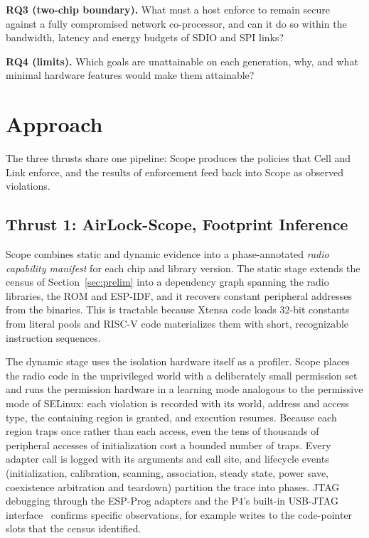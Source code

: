 \documentclass[conference,10pt]{IEEEtran}
\begin{document}
\textbf{RQ3 (two-chip boundary).} What must a host enforce to remain secure against a fully compromised network co-processor, and can it do so within the bandwidth, latency and energy budgets of SDIO and SPI links?

\textbf{RQ4 (limits).} Which goals are unattainable on each generation, why, and what minimal hardware features would make them attainable?

\section{Approach}
\label{sec:approach}

The three thrusts share one pipeline: Scope produces the policies that Cell and Link enforce, and the results of enforcement feed back into Scope as observed violations.

\subsection{Thrust 1: AirLock-Scope, Footprint Inference}

Scope combines static and dynamic evidence into a phase-annotated \emph{radio capability manifest} for each chip and library version. The static stage extends the census of Section~\ref{sec:prelim} into a dependency graph spanning the radio libraries, the ROM and ESP-IDF, and it recovers constant peripheral addresses from the binaries. This is tractable because Xtensa code loads 32-bit constants from literal pools and RISC-V code materializes them with short, recognizable instruction sequences.

The dynamic stage uses the isolation hardware itself as a profiler. Scope places the radio code in the unprivileged world with a deliberately small permission set and runs the permission hardware in a learning mode analogous to the permissive mode of SELinux: each violation is recorded with its world, address and access type, the containing region is granted, and execution resumes. Because each region traps once rather than each access, even the tens of thousands of peripheral accesses of initialization cost a bounded number of traps. Every adapter call is logged with its arguments and call site, and lifecycle events (initialization, calibration, scanning, association, steady state, power save, coexistence arbitration and teardown) partition the trace into phases. JTAG debugging through the ESP-Prog adapters and the P4's built-in USB-JTAG interface~\cite{espprog2,esp32p4jtag} confirms specific observations, for example writes to the code-pointer slots that the census identified.
\end{document}
